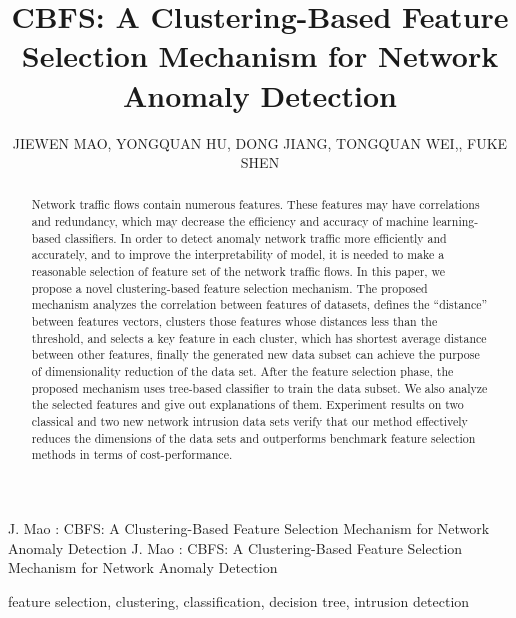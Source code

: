 \documentclass{ieeeaccess}
\theoremstyle{definition}
\begin{document}

\title{CBFS: A Clustering-Based Feature Selection Mechanism for Network Anomaly Detection}
\author{
    \uppercase{Jiewen Mao},
    \uppercase{Yongquan Hu},
    \uppercase{Dong Jiang},
    \uppercase{Tongquan Wei},, \uppercase{Fuke Shen}}
\address{School of Computer Science and Technology, East China Normal University, Shanghai 200062, China}

\markboth
{J. Mao \headeretal: CBFS: A Clustering-Based Feature Selection Mechanism for Network Anomaly Detection}
{J. Mao \headeretal: CBFS: A Clustering-Based Feature Selection Mechanism for Network Anomaly Detection}


\begin{abstract}
Network traffic flows contain numerous features. These features may have correlations and redundancy, which may decrease the efficiency and accuracy of machine learning-based classifiers. In order to detect anomaly network traffic more efficiently and accurately, and to improve the interpretability of model, it is needed to make a reasonable selection of feature set of the network traffic flows. In this paper, we propose a novel clustering-based feature selection mechanism. The proposed mechanism analyzes the correlation between features of datasets, defines the ``distance'' between features vectors, clusters those features whose distances less than the threshold, and selects a key feature in each cluster, which has shortest average distance between other features, finally the generated new data subset can achieve the purpose of dimensionality reduction of the data set. After the feature selection phase, the proposed mechanism uses tree-based classifier to train the data subset. We also analyze the selected features and give out explanations of them. Experiment results on two classical and two new network intrusion data sets verify that our method effectively reduces the dimensions of the data sets and outperforms benchmark feature selection methods in terms of cost-performance.
\end{abstract}

\begin{keywords}
    feature selection, clustering, classification, decision tree, intrusion detection
\end{keywords}
\end{document}
